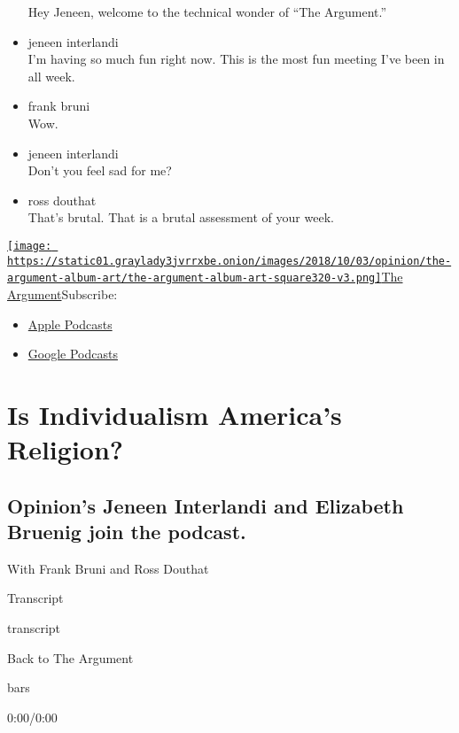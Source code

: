 \begin{itemize}
  Hey Jeneen, welcome to the technical wonder of ``The Argument.''
\item
  jeneen interlandi\\
  I'm having so much fun right now. This is the most fun meeting I've
  been in all week.
\item
  frank bruni\\
  Wow.
\item
  jeneen interlandi\\
  Don't you feel sad for me?
\item
  ross douthat\\
  That's brutal. That is a brutal assessment of your week.
\end{itemize}

\href{https://www.nytimes3xbfgragh.onion/column/the-argument}{\texttt{[image: https://static01.graylady3jvrrxbe.onion/images/2018/10/03/opinion/the-argument-album-art/the-argument-album-art-square320-v3.png]}The
Argument}Subscribe:

\begin{itemize}
\tightlist
\item
  \href{https://itunes.apple.com/us/podcast/id1438024613}{Apple
  Podcasts}
\item
  \href{https://www.google.com/podcasts?feed=aHR0cHM6Ly9yc3MuYXJ0MTkuY29tL3RoZS1hcmd1bWVudA\%3D\%3D}{Google
  Podcasts}
\end{itemize}

\hypertarget{is-individualism-americas-religion-1}{%
\section{Is Individualism America's
Religion?}\label{is-individualism-americas-religion-1}}

\hypertarget{opinions-jeneen-interlandi-and-elizabeth-bruenig-join-the-podcast-1}{%
\subsection{Opinion's Jeneen Interlandi and Elizabeth Bruenig join the
podcast.}\label{opinions-jeneen-interlandi-and-elizabeth-bruenig-join-the-podcast-1}}

With Frank Bruni and Ross Douthat

Transcript

transcript

Back to The Argument

bars

0:00/0:00

